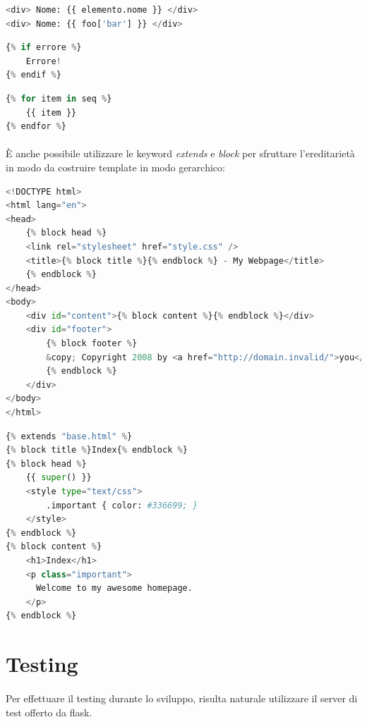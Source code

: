 \documentclass[12pt,a4paper,twoside,english,italian]{book}
\begin{document}
\begin{lstlisting}[language=Python, caption=Scrivere il valore di una variabile]
<div> Nome: {{ elemento.nome }} </div>
<div> Nome: {{ foo['bar'] }} </div>
\end{lstlisting}

\begin{lstlisting}[language=Python, caption=Valutare una condizione]
{% if errore %}
    Errore!
{% endif %}
\end{lstlisting}

\begin{lstlisting}[language=Python, caption=Iterare su una lista]
{% for item in seq %}
    {{ item }}
{% endfor %}
\end{lstlisting}

\paragraph{} È anche possibile utilizzare le keyword \emph{extends} e \emph{block} per sfruttare l'ereditarietà in modo da costruire template in modo gerarchico:

\begin{lstlisting}[language=Python, caption=Padre]
<!DOCTYPE html>
<html lang="en">
<head>
    {% block head %}
    <link rel="stylesheet" href="style.css" />
    <title>{% block title %}{% endblock %} - My Webpage</title>
    {% endblock %}
</head>
<body>
    <div id="content">{% block content %}{% endblock %}</div>
    <div id="footer">
        {% block footer %}
        &copy; Copyright 2008 by <a href="http://domain.invalid/">you</a>.
        {% endblock %}
    </div>
</body>
</html>
\end{lstlisting}


\begin{lstlisting}[language=Python, caption=Figlio]
{% extends "base.html" %}
{% block title %}Index{% endblock %}
{% block head %}
    {{ super() }}
    <style type="text/css">
        .important { color: #336699; }
    </style>
{% endblock %}
{% block content %}
    <h1>Index</h1>
    <p class="important">
      Welcome to my awesome homepage.
    </p>
{% endblock %}
\end{lstlisting}

\newpage

\section{Testing}

\paragraph{} Per effettuare il testing durante lo sviluppo, risulta naturale utilizzare il server di test offerto da flask. 
\end{document}
